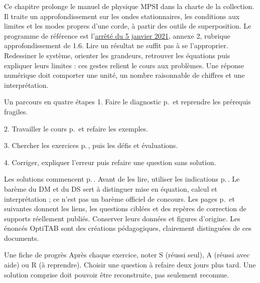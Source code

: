 \thispagestyle{mpsiFront}
Ce chapitre prolonge le manuel de physique MPSI dans la charte de la collection. Il traite un approfondissement sur les ondes stationnaires, les conditions aux limites et les modes propres d’une corde, à partir des outils de superposition. Le programme de référence est l’\href{https://www.education.gouv.fr/bo/21/Special1/ESRS2035779A.htm}{arrêté du 5 janvier 2021}, annexe 2, rubrique approfondissement de 1.6.
Lire un résultat ne suffit pas à se l’approprier. Redessiner le système, orienter les grandeurs, retrouver les équations puis expliquer leurs limites : ces gestes relient le cours aux problèmes. Une réponse numérique doit comporter une unité, un nombre raisonnable de chiffres et une interprétation.
\begin{loi}{Un parcours en quatre étapes}
1. Faire le diagnostic p.\,\pageref{diagnostic} et reprendre les prérequis fragiles.\par
2. Travailler le cours p.\,\pageref{cours-1} et refaire les exemples.\par
3. Chercher les exercices p.\,\pageref{td1}, puis les défis et évaluations.\par
4. Corriger, expliquer l’erreur puis refaire une question sans solution.
\end{loi}
Les solutions commencent p.\,\pageref{corr-diag}. Avant de les lire, utiliser les indications p.\,\pageref{indices}. Le barème du DM et du DS sert à distinguer mise en équation, calcul et interprétation ; ce n’est pas un barème officiel de concours.
Les pages p.\,\pageref{sources-1} et suivantes donnent les liens, les questions ciblées et des repères de correction de supports réellement publiés. Conserver leurs données et figures d’origine. Les énoncés OptiTAB sont des créations pédagogiques, clairement distinguées de ces documents.
\begin{methode}{Une fiche de progrès}
Après chaque exercice, noter S (réussi seul), A (réussi avec aide) ou R (à reprendre). Choisir une question à refaire deux jours plus tard. Une solution comprise doit pouvoir être reconstruite, pas seulement reconnue.
\end{methode}


